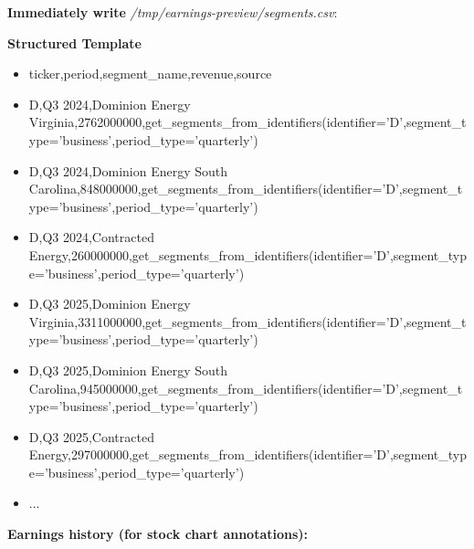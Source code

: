 \documentclass[11pt]{article}
\begin{document}
\textbf{Immediately write} \emph{/tmp/earnings-preview/segments.csv}:

\textbf{Structured Template}
\begin{itemize}[leftmargin=*,itemsep=2pt,topsep=2pt]
\item {} ticker,period,segment\_\allowbreak{}name,revenue,source
\item {} D,Q3 2024,Dominion Energy Virginia,2762000000,get\_\allowbreak{}segments\_\allowbreak{}from\_\allowbreak{}identifiers(identifier='D',segment\_\allowbreak{}type='business',period\_\allowbreak{}type='quarterly')
\item {} D,Q3 2024,Dominion Energy South Carolina,848000000,get\_\allowbreak{}segments\_\allowbreak{}from\_\allowbreak{}identifiers(identifier='D',segment\_\allowbreak{}type='business',period\_\allowbreak{}type='quarterly')
\item {} D,Q3 2024,Contracted Energy,260000000,get\_\allowbreak{}segments\_\allowbreak{}from\_\allowbreak{}identifiers(identifier='D',segment\_\allowbreak{}type='business',period\_\allowbreak{}type='quarterly')
\item {} D,Q3 2025,Dominion Energy Virginia,3311000000,get\_\allowbreak{}segments\_\allowbreak{}from\_\allowbreak{}identifiers(identifier='D',segment\_\allowbreak{}type='business',period\_\allowbreak{}type='quarterly')
\item {} D,Q3 2025,Dominion Energy South Carolina,945000000,get\_\allowbreak{}segments\_\allowbreak{}from\_\allowbreak{}identifiers(identifier='D',segment\_\allowbreak{}type='business',period\_\allowbreak{}type='quarterly')
\item {} D,Q3 2025,Contracted Energy,297000000,get\_\allowbreak{}segments\_\allowbreak{}from\_\allowbreak{}identifiers(identifier='D',segment\_\allowbreak{}type='business',period\_\allowbreak{}type='quarterly')
\item {} ...
\end{itemize}

\textbf{Earnings history (for stock chart annotations):}
\end{document}
